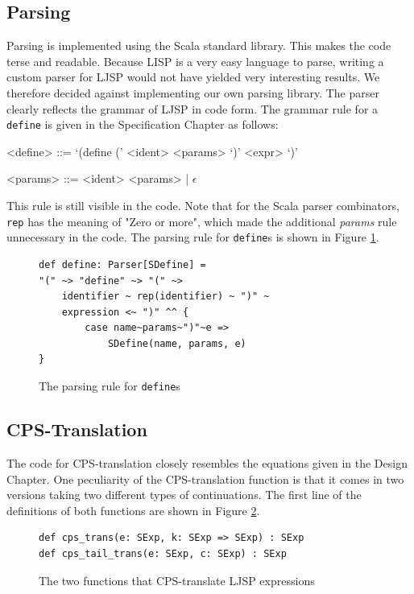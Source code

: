 \documentclass[11pt]{report}
\begin{document}
\subsection{Parsing}
Parsing is implemented using the Scala standard library. This makes the code terse and readable. Because LISP is a very easy language to parse, writing a custom parser for LJSP would not have yielded very interesting results. We therefore decided against implementing our own parsing library. The parser clearly reflects the grammar of LJSP in code form. The grammar rule for a \texttt{define} is given in the Specification Chapter as follows:

\begin{grammar}
<define> ::= `(define (' <ident> <params> `)' <expr> `)'

<params> ::= <ident> <params> | $\epsilon$
\end{grammar}

This rule is still visible in the code. Note that for the Scala parser combinators, \texttt{rep} has the meaning of "Zero or more", which made the additional \textit{params} rule unnecessary in the code. The parsing rule for \texttt{define}s is shown in Figure \ref{parsingrule}.

\begin{figure}[ht]
\begin{lstlisting}
def define: Parser[SDefine] = 
"(" ~> "define" ~> "(" ~> 
    identifier ~ rep(identifier) ~ ")" ~ 
    expression <~ ")" ^^ {
        case name~params~")"~e => 
            SDefine(name, params, e)
}
\end{lstlisting}
\caption{The parsing rule for \texttt{define}s}
\label{parsingrule}
\end{figure}



\subsection{CPS-Translation}
The code for CPS-translation closely resembles the equations given in the Design Chapter. One peculiarity of the CPS-translation function is that it comes in two versions taking two different types of continuations. The first line of the definitions of both functions are shown in Figure \ref{cpstranstwofuncs}.

\begin{figure}[ht]
\begin{lstlisting}
def cps_trans(e: SExp, k: SExp => SExp) : SExp
def cps_tail_trans(e: SExp, c: SExp) : SExp
\end{lstlisting}
\caption{The two functions that CPS-translate LJSP expressions}
\label{cpstranstwofuncs}
\end{figure}
\end{document}
